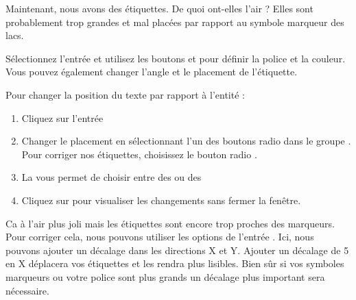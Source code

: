 Maintenant, nous avons des étiquettes. De quoi ont-elles l'air ? Elles sont probablement trop grandes et mal placées par rapport au symbole marqueur des lacs.

Sélectionnez l'entrée  et utilisez les boutons  et  pour définir la police et la couleur. Vous pouvez également changer l'angle et le placement de l'étiquette.

Pour changer la position du texte par rapport à l'entité :

\begin{enumerate}
\item Cliquez sur l'entrée 
\item Changer le placement en sélectionnant l'un des boutons radio dans le groupe . Pour corriger nos étiquettes, choisissez le bouton radio .
\item La  vous permet de choisir entre  des  ou des 
\item Cliquez sur  pour visualiser les changements sans fermer la fenêtre.
\end{enumerate}

Ca à l'air plus joli mais les étiquettes sont encore trop proches des marqueurs. Pour corriger cela, nous pouvons utiliser les options de l'entrée . Ici, nous pouvons ajouter un décalage dans les directions X et Y. Ajouter un décalage de 5 en X déplacera vos étiquettes et les rendra plus lisibles. Bien sûr si vos symboles marqueurs ou votre police sont plus grands un décalage plus important sera nécessaire.

